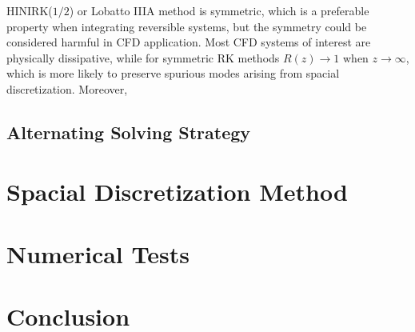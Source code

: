 \documentclass[preprint,12pt]{elsarticle}
\begin{document}
HINIRK($1/2$) or Lobatto IIIA method is symmetric, 
which is a preferable property when integrating 
reversible systems, 
but the symmetry could be considered harmful in CFD application.
Most CFD systems of interest are physically dissipative,
while for symmetric RK methods 
$R(z) \rightarrow 1$ when $z \rightarrow \infty$, 
which is more likely to preserve 
spurious modes arising from spacial discretization.  
Moreover, 

\subsection{Alternating Solving Strategy}

\section{Spacial Discretization Method}


\section{Numerical Tests}

\section{Conclusion}











\end{document}
